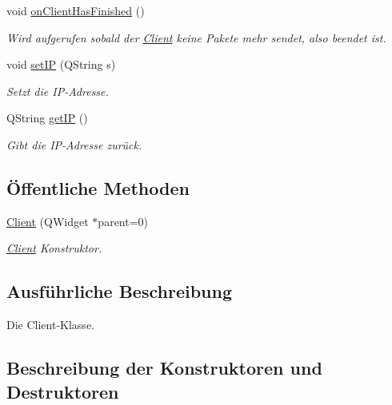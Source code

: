 \begin{DoxyCompactItemize}
\hypertarget{class_client_a01f6d4ddcb338116dc4a4ba320f47456}{}\label{class_client_a01f6d4ddcb338116dc4a4ba320f47456} 
void \hyperlink{class_client_a01f6d4ddcb338116dc4a4ba320f47456}{on\+Client\+Has\+Finished} ()
\begin{DoxyCompactList}\small\item\em Wird aufgerufen sobald der \hyperlink{class_client}{Client} keine Pakete mehr sendet, also beendet ist. \end{DoxyCompactList}\item 
void \hyperlink{class_client_a9699e2db43beff88b4694208c54c1b7f}{set\+IP} (Q\+String s)
\begin{DoxyCompactList}\small\item\em Setzt die I\+P-\/\+Adresse. \end{DoxyCompactList}\item 
Q\+String \hyperlink{class_client_a91bf1f59731649499365d8b18e6aee62}{get\+IP} ()
\begin{DoxyCompactList}\small\item\em Gibt die I\+P-\/\+Adresse zurück. \end{DoxyCompactList}\end{DoxyCompactItemize}
\subsection*{Öffentliche Methoden}
\begin{DoxyCompactItemize}
\item 
\hyperlink{class_client_ab9cb979d7fb7dd0bd3bf645279a6ffb5}{Client} (Q\+Widget $\ast$parent=0)
\begin{DoxyCompactList}\small\item\em \hyperlink{class_client}{Client} Konstruktor. \end{DoxyCompactList}\end{DoxyCompactItemize}


\subsection{Ausführliche Beschreibung}
Die Client-\/\+Klasse. 

\subsection{Beschreibung der Konstruktoren und Destruktoren}
\hypertarget{class_client_ab9cb979d7fb7dd0bd3bf645279a6ffb5}{}\label{class_client_ab9cb979d7fb7dd0bd3bf645279a6ffb5} 

